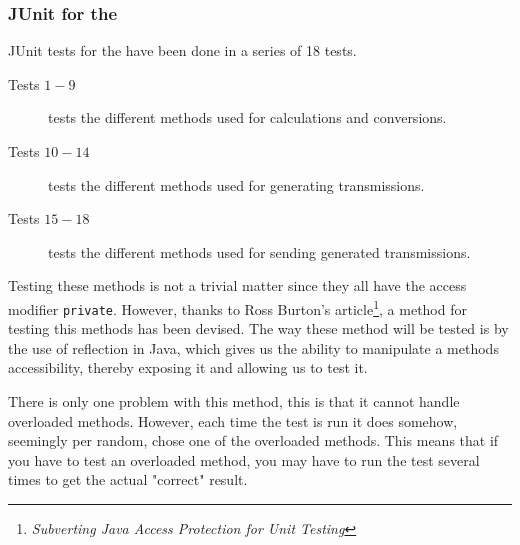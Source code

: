 \subsubsection*{JUnit for the }
JUnit tests for the  have been done in a series of 18 tests. %
\begin{description}
	\item[Tests $1-9$] tests the different methods used for calculations and conversions.
	\item[Tests $10-14$] tests the different methods used for generating transmissions.
	\item[Tests $15-18$] tests the different methods used for sending generated transmissions.
\end{description}
Testing these methods is not a trivial matter since they all have the access modifier \lstinline[style=sw6Java]{private}. However, thanks to Ross Burton's article\footnote{\textit{Subverting Java Access Protection for Unit Testing}\cite{onJava}}, a method for testing this methods has been devised. The way these method will be tested is by the use of reflection in Java, which gives us the ability to manipulate a methods accessibility, thereby exposing it and allowing us to test it. 

There is only one problem with this method, this is that it cannot handle overloaded methods. However, each time the test is run it does somehow, seemingly per random, chose one of the overloaded methods. This means that if you have to test an overloaded method, you may have to run the test several times to get the actual "correct" result.

